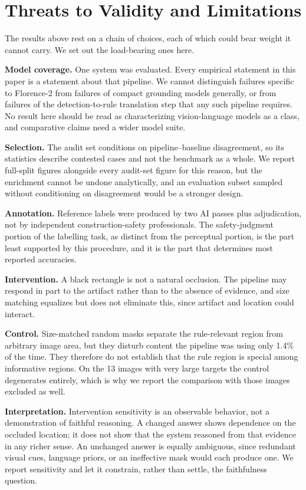 \documentclass[conference]{IEEEtran}
\begin{document}
\section{Threats to Validity and Limitations}

The results above rest on a chain of choices, each of which could bear weight it cannot carry. We set out the load-bearing ones here.

\textbf{Model coverage.} One system was evaluated. Every empirical statement in this paper is a statement about that pipeline. We cannot distinguish failures specific to Florence-2 from failures of compact grounding models generally, or from failures of the detection-to-rule translation step that any such pipeline requires. No result here should be read as characterizing vision-language models as a class, and comparative claims need a wider model suite.

\textbf{Selection.} The audit set conditions on pipeline--baseline disagreement, so its statistics describe contested cases and not the benchmark as a whole. We report full-split figures alongside every audit-set figure for this reason, but the enrichment cannot be undone analytically, and an evaluation subset sampled without conditioning on disagreement would be a stronger design.

\textbf{Annotation.} Reference labels were produced by two AI passes plus adjudication, not by independent construction-safety professionals. The safety-judgment portion of the labelling task, as distinct from the perceptual portion, is the part least supported by this procedure, and it is the part that determines most reported accuracies.

\textbf{Intervention.} A black rectangle is not a natural occlusion. The pipeline may respond in part to the artifact rather than to the absence of evidence, and size matching equalizes but does not eliminate this, since artifact and location could interact.

\textbf{Control.} Size-matched random masks separate the rule-relevant region from arbitrary image area, but they disturb content the pipeline was using only 1.4\% of the time. They therefore do not establish that the rule region is special among informative regions. On the 13 images with very large targets the control degenerates entirely, which is why we report the comparison with those images excluded as well.

\textbf{Interpretation.} Intervention sensitivity is an observable behavior, not a demonstration of faithful reasoning. A changed answer shows dependence on the occluded location; it does not show that the system reasoned from that evidence in any richer sense. An unchanged answer is equally ambiguous, since redundant visual cues, language priors, or an ineffective mask would each produce one. We report sensitivity and let it constrain, rather than settle, the faithfulness question.
\end{document}
